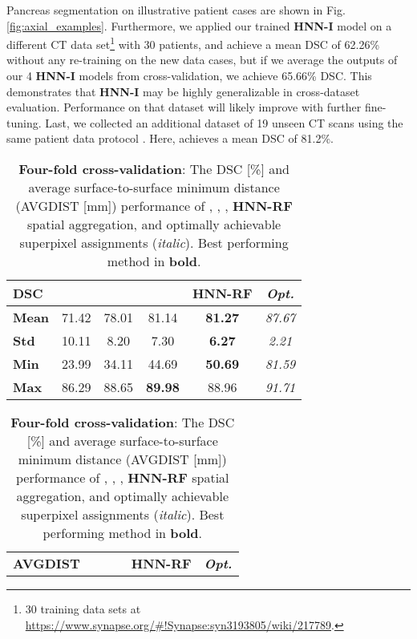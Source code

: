 \documentclass[journal]{IEEEtran}
\begin{document}
Pancreas segmentation on illustrative patient cases are shown in Fig. \ref{fig:axial_examples}. Furthermore, we applied our trained \textbf{HNN-I} model on a different CT data set\footnote{\scriptsize 30 training data sets at \url{https://www.synapse.org/\#!Synapse:syn3193805/wiki/217789}.} with 30 patients, and achieve a mean DSC of 62.26\% without any re-training on the new data cases, but if we average the outputs of our 4 \textbf{HNN-I} models from cross-validation, we achieve 65.66\% DSC. This demonstrates that \textbf{HNN-I} may be highly generalizable in cross-dataset evaluation. Performance on that dataset will likely improve with further fine-tuning. Last, we collected an additional dataset of 19 unseen CT scans using the same patient data protocol \cite{roth2015deeporgan,roth2016spatial}. Here,  achieves a mean DSC of 81.2\%.  
\begin{table}[htb]
\centering
 \caption{\small \textbf{Four-fold cross-validation}: The DSC [\%] and average surface-to-surface minimum distance (AVGDIST [mm]) performance of \cite{roth2015deeporgan}, \cite{roth2016spatial}, , \textbf{HNN-RF} spatial aggregation, and optimally achievable superpixel assignments (\textit{italic}). Best performing method in \textbf{bold}.} 
\begin{subtable}[center]{0.95\columnwidth}
  \raggedright
    \begin{tabular}{l|c|c|c|c|c}
    \toprule
		\toprule
    \textbf{DSC} & \cite{roth2015deeporgan}  & \cite{roth2016spatial}&  & \textbf{HNN-RF} & \textit{\textbf{Opt.}} \\
		\midrule    
\textbf{Mean}	&71.42 & 78.01& 81.14                 &\textbf{81.27}  	& \textit{87.67}   \\
\textbf{Std}      &10.11 & 8.20  	      & 7.30                   &\textbf{6.27} & \textit{ 2.21}  \\
\textbf{Min}	&23.99 & 34.11 	   &	44.69                  &\textbf{50.69} & \textit{81.59}\\
\textbf{Max}	&86.29 & 88.65  	   &	\textbf{89.98} &88.96 & \textit{ 91.71} \\
    \bottomrule
		\bottomrule
    \end{tabular}\end{subtable}\vskip 8pt  
 \begin{subtable}[center]{0.95\columnwidth}
 \raggedright
    \begin{tabular}{l|c|c|c|c|c}
    \toprule
		\toprule
    \textbf{AVGDIST} & \cite{roth2015deeporgan} & \cite{roth2016spatial} &  & \textbf{HNN-RF} & \textit{\textbf{Opt.}}\\

\end{tabular}
\end{subtable}
\end{table}
\end{document}
